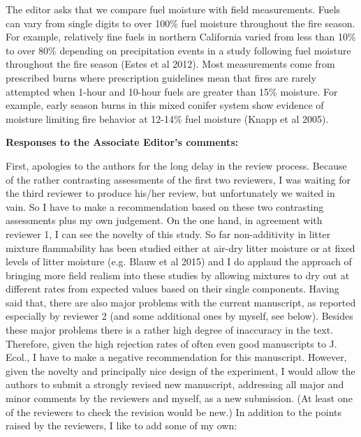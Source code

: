 \documentclass[letterpaper, 12pt]{letter}
\begin{document}
\begin{letter}{}
The editor asks that we compare fuel moisture with field measurements. Fuels
can vary from single digits to over 100\% fuel moisture throughout the fire
season. For example, relatively fine fuels in northern California varied from
less than 10\% to over 80\% depending on precipitation events in a study
following fuel moisture throughout the fire season (Estes et al 2012). Most
measurements come from prescribed burns where prescription guidelines mean that
fires are rarely attempted when 1-hour and 10-hour fuels are greater than 15\%
moisture. For example, early season burns in this mixed conifer system show
evidence of moisture limiting fire behavior at 12-14\% fuel moisture (Knapp et
al 2005).

{\bf Responses to the Associate Editor's comments:}

\begin{quoting}
  First, apologies to the authors for the long delay in the review process.
  Because of the rather contrasting assessments of the first two reviewers, I
  was waiting for the third reviewer to produce his/her review, but
  unfortunately we waited in vain. So I have to make a recommendation based on
  these two contrasting assessments plus my own judgement. On the one hand, in
  agreement with reviewer 1, I can see the novelty of this study. So far
  non-additivity in litter mixture flammability has been studied either at
  air-dry litter moisture or at fixed levels of litter moisture (e.g. Blauw et
  al 2015) and I do applaud the approach of bringing more field realism into
  these studies by allowing mixtures to dry out at different rates from
  expected values based on their single components. Having said that, there are
  also major problems with the current manuscript, as reported especially by
  reviewer 2 (and some additional ones by myself, see below). Besides these
  major problems there is a rather high degree of inaccuracy in the text.
  Therefore, given the high rejection rates of often even good manuscripts to
  J. Ecol., I have to make a negative recommendation for this manuscript.
  However, given the novelty and principally nice design of the experiment, I
  would allow the authors to submit a strongly revised new manuscript,
  addressing all major and minor comments by the reviewers and myself, as a new
  submission. (At least one of the reviewers to check the revision would be
  new.) In addition to the points raised by the reviewers, I like to add some
  of my own:
\end{quoting}


\end{letter}
\end{document}
